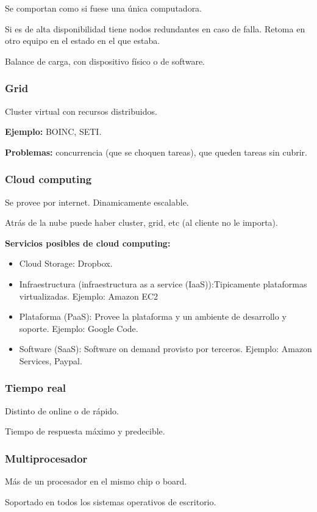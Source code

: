 \documentclass[a4paper, twoside]{article}
\begin{document}
Se comportan como si fuese una única computadora.

Si es de alta disponibilidad tiene nodos redundantes en caso de falla. Retoma en otro equipo en el estado en el que estaba. 

Balance de carga, con dispositivo físico o de software.

\subsubsection{Grid}
Cluster virtual con recursos distribuidos.

\textbf{Ejemplo:} BOINC, SETI.

\textbf{Problemas:} concurrencia (que se choquen tareas), que queden tareas sin cubrir.

\subsubsection{Cloud computing}
Se provee por internet. Dinamicamente escalable.

Atrás de la nube puede haber cluster, grid, etc (al cliente no le importa).

\textbf{Servicios posibles de cloud computing:}
\begin{itemize}
	\item Cloud Storage: Dropbox.
	\item Infraestructura (infraestructura as a service (IaaS)):Tipicamente plataformas virtualizadas. Ejemplo: Amazon EC2
	\item Plataforma (PaaS): Provee la plataforma y un ambiente de desarrollo y soporte. Ejemplo: Google Code.
	\item Software (SaaS): Software on demand provisto por terceros. Ejemplo: Amazon Services, Paypal. 
\end{itemize}

\subsubsection{Tiempo real}
Distinto de online o de rápido.

Tiempo de respuesta máximo y predecible. 

\subsubsection{Multiprocesador}
Más de un procesador en el mismo chip o board.

Soportado en todos los sistemas operativos de escritorio.
\end{document}
